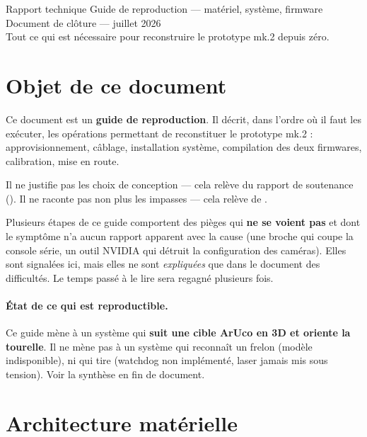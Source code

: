 \documentclass[11pt,a4paper]{article}
\begin{document}
\vespatitlepage
  {Rapport technique}
  {Guide de reproduction — matériel, système, firmware}
  {Document de clôture — juillet 2026\\
   Tout ce qui est nécessaire pour reconstruire le prototype mk.2 depuis zéro.}

\tableofcontents
\newpage

\section{Objet de ce document}

Ce document est un \textbf{guide de reproduction}. Il décrit, dans l'ordre où il faut les
exécuter, les opérations permettant de reconstituer le prototype \vespa{} mk.2 :
approvisionnement, câblage, installation système, compilation des deux firmwares,
calibration, mise en route.

Il ne justifie pas les choix de conception — cela relève du rapport de soutenance
(). Il ne raconte pas non plus les impasses —
cela relève de .

\begin{avertissement}
Plusieurs étapes de ce guide comportent des pièges qui \textbf{ne se voient pas} et dont le
symptôme n'a aucun rapport apparent avec la cause (une broche qui coupe la console série,
un outil NVIDIA qui détruit la configuration des caméras). Elles sont signalées ici, mais
elles ne sont \emph{expliquées} que dans le document des difficultés. Le temps passé à le
lire sera regagné plusieurs fois.
\end{avertissement}

\paragraph{État de ce qui est reproductible.} Ce guide mène à un système qui \textbf{suit
une cible ArUco en 3D et oriente la tourelle}. Il ne mène pas à un système qui reconnaît un
frelon (modèle indisponible), ni qui tire (watchdog non implémenté, laser jamais mis sous
tension). Voir la synthèse en fin de document.

\section{Architecture matérielle}
\end{document}
